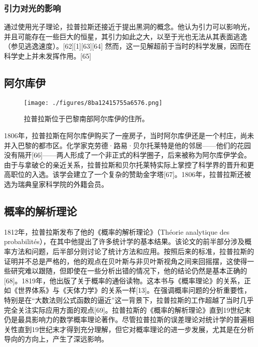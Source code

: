 \subsubsection{引力对光的影响}  
通过使用光子理论，拉普拉斯还接近于提出黑洞的概念。他认为引力可以影响光，并且可能存在一些巨大的恒星，其引力如此之大，以至于光也无法从其表面逃逸（参见逃逸速度）。[62][1][63][64] 然而，这一见解超前于当时的科学发展，因而在科学史上并未发挥作用。[65]
\subsection{阿尔库伊}
\begin{figure}[ht]
\centering
\texttt{[image: ./figures/8ba12415755a6576.png]}
\caption{拉普拉斯位于巴黎南部阿尔库伊的住所。} \label{fig_LPLS_9}
\end{figure}
1806年，拉普拉斯在阿尔库伊购买了一座房子，当时阿尔库伊还是一个村庄，尚未并入巴黎的都市区。化学家克劳德·路易·贝尔托莱特是他的邻居——他们的花园没有隔开[66]——两人形成了一个非正式的科学圈子，后来被称为阿尔库伊学会。由于与拿破仑的亲近关系，拉普拉斯和贝尔托莱特实际上掌控了科学界的晋升和更高职位的入选。该学会建立了一个复杂的赞助金字塔[67]。1806年，拉普拉斯还被选为瑞典皇家科学院的外籍会员。
\subsection{概率的解析理论}  
1812年，拉普拉斯发布了他的《概率的解析理论》（Théorie analytique des probabilités），在其中他提出了许多统计学的基本结果。该论文的前半部分涉及概率方法和问题，后半部分则讨论了统计方法和应用。按照后来的标准，拉普拉斯的证明并不总是严格的，他的观点在贝叶斯与非贝叶斯视角之间来回摇摆，这使得一些研究难以跟随，但即使在一些分析出错的情况下，他的结论仍然是基本正确的[68]。1819年，他出版了关于概率的通俗读物。这本书与《概率理论》的关系，正如《世界体系》与《天体力学》的关系一样[13]。在强调概率问题的分析重要性，特别是在“大数法则公式函数的逼近”这一背景下，拉普拉斯的工作超越了当时几乎完全关注实际应用方面的观点[69]。拉普拉斯的《概率的解析理论》直到19世纪末仍是最具影响力的数学概率理论著作。尽管拉普拉斯的误差理论对统计学的普遍相关性直到19世纪末才得到充分理解，但它对概率理论的进一步发展，尤其是在分析导向的方向上，产生了深远影响。
